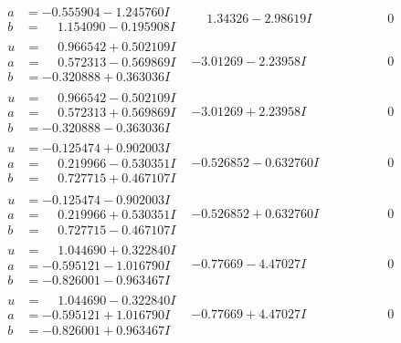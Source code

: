\documentclass[1p]{elsarticle_modified}
\theoremstyle{definition}
\begin{document}
$$\begin{array}{c|c|c}
\begin{aligned}
a &= -0.555904 - 1.245760 I \\
b &= \phantom{-}1.154090 - 0.195908 I\end{aligned}
 & \phantom{-}1.34326 - 2.98619 I & \phantom{-0.000000 } 0 \\ \hline\begin{aligned}
u &= \phantom{-}0.966542 + 0.502109 I \\
a &= \phantom{-}0.572313 - 0.569869 I \\
b &= -0.320888 + 0.363036 I\end{aligned}
 & -3.01269 - 2.23958 I & \phantom{-0.000000 } 0 \\ \hline\begin{aligned}
u &= \phantom{-}0.966542 - 0.502109 I \\
a &= \phantom{-}0.572313 + 0.569869 I \\
b &= -0.320888 - 0.363036 I\end{aligned}
 & -3.01269 + 2.23958 I & \phantom{-0.000000 } 0 \\ \hline\begin{aligned}
u &= -0.125474 + 0.902003 I \\
a &= \phantom{-}0.219966 - 0.530351 I \\
b &= \phantom{-}0.727715 + 0.467107 I\end{aligned}
 & -0.526852 - 0.632760 I & \phantom{-0.000000 } 0 \\ \hline\begin{aligned}
u &= -0.125474 - 0.902003 I \\
a &= \phantom{-}0.219966 + 0.530351 I \\
b &= \phantom{-}0.727715 - 0.467107 I\end{aligned}
 & -0.526852 + 0.632760 I & \phantom{-0.000000 } 0 \\ \hline\begin{aligned}
u &= \phantom{-}1.044690 + 0.322840 I \\
a &= -0.595121 - 1.016790 I \\
b &= -0.826001 - 0.963467 I\end{aligned}
 & -0.77669 - 4.47027 I & \phantom{-0.000000 } 0 \\ \hline\begin{aligned}
u &= \phantom{-}1.044690 - 0.322840 I \\
a &= -0.595121 + 1.016790 I \\
b &= -0.826001 + 0.963467 I\end{aligned}
 & -0.77669 + 4.47027 I & \phantom{-0.000000 } 0 \\ \hline\begin{aligned}

\end{aligned}
\end{array}$$
\end{document}
